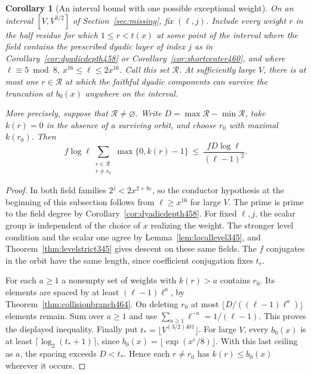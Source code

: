 \documentclass[a4paper,11pt]{article}
\newtheorem{corollary}[proposition]{Corollary}
\theoremstyle{definition}
\theoremstyle{remark}
\numberwithin{equation}{section}
\begin{document}
\begin{corollary}[An interval bound with one possible exceptional weight]\leavevmode
\label{cor:onedeepweight464}
On an interval \([V,V^{3/2}]\) of Section~\ref{sec:missing},
fix \((\ell,j)\). Include every weight \(r\) in the half residue
for which \(1\le r<t(x)\) at some point of the interval where
the field contains the prescribed dyadic layer of index \(j\)
as in Corollary~\ref{cor:dyadicdepth458} or
Corollary~\ref{cor:shortcenter460}, and where
\(\ell\equiv5\bmod8\), \(x^{16}\le\ell\le2x^{16}\).
Call this set \(\mathcal R\). At sufficiently large \(V\),
there is at most one \(r\in\mathcal R\) at which the faithful
dyadic components can survive the truncation at \(b_0(x)\)
anywhere on the interval.

More precisely, suppose that \(\mathcal R\ne\varnothing\).
Write \(D=\max\mathcal R-\min\mathcal R\), take \(k(r)=0\)
in the absence of a surviving orbit, and choose \(r_0\) with
maximal \(k(r_0)\). Then
\[
 f\log\ell\sum_{\substack{r\in\mathcal R\\r\ne r_0}}
             \max\{0,k(r)-1\}
       \ \le\ \frac{fD\log\ell}{(\ell-1)^2}.
\]
\end{corollary}
\begin{proof}
In both field families \(2^j<2x^{2+8\varepsilon}\), so the
conductor hypothesis at the beginning of this subsection follows
from \(\ell\ge x^{16}\) for large \(V\). The prime is prime to
the field degree by Corollary~\ref{cor:dyadicdepth458}. For
fixed \(\ell,j\), the scalar group is independent of the choice
of \(x\) realizing the weight. The stronger level condition and
the scalar one agree by Lemma~\ref{lem:locallevel345}, and
Theorem~\ref{thm:levelstrict345} gives descent on these same
fields. The \(f\) conjugates in the orbit have the same length,
since coefficient conjugation fixes \(t_r\).

For each \(a\ge1\) a nonempty set of weights with \(k(r)>a\)
contains \(r_0\). Its elements are spaced by at least
\((\ell-1)\ell^a\), by Theorem~\ref{thm:collisionbranch464}.
On deleting \(r_0\) at most
\(\lfloor D/((\ell-1)\ell^a)\rfloor\) elements remain.
Sum over \(a\ge1\) and use
\(\sum_{a\ge1}\ell^{-a}=1/(\ell-1)\). This proves the displayed
inequality. Finally put \(t_*=\lfloor V^{(3/2)401}\rfloor\).
For large \(V\), every \(b_0(x)\) is at least
\(\lceil\log_2(t_*+1)\rceil\), since
\(b_0(x)=\lfloor\exp(x^\varepsilon/8)\rfloor\).
With this last ceiling as \(a\), the spacing exceeds
\(D<t_*\). Hence each \(r\ne r_0\) has \(k(r)\le b_0(x)\)
wherever it occurs.
\end{proof}
\end{document}

